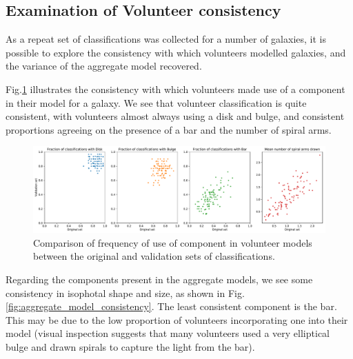 \documentclass[../main.tex]{subfiles}
\begin{document}
\label{sec:results}

\subsection{Examination of Volunteer consistency}
As a repeat set of classifications was collected for a number of galaxies, it is possible to explore the consistency with which volunteers modelled galaxies, and the variance of the aggregate model recovered.

Fig.\ref{fig:volunteer_component_consistency} illustrates the consistency with which volunteers made use of a component in their model for a galaxy. We see that volunteer classification is quite consistent, with volunteers almost always using a disk and bulge, and consistent proportions agreeing on the presence of a bar and the number of spiral arms.

\begin{figure}
  \includegraphics[width=17.3cm]{images__results/component_frequency.pdf}
  \caption{Comparison of frequency of use of component in volunteer models between the original and validation sets of classifications.}
  \label{fig:volunteer_component_consistency}
\end{figure}

Regarding the components present in the aggregate models, we see some consistency in isophotal shape and size, as shown in Fig.\ref{fig:aggregate_model_consistency}. The least consistent component is the bar. This may be due to the low proportion of volunteers incorporating one into their model (visual inspection suggests that many volunteers used a very elliptical bulge and drawn spirals to capture the light from the bar).
\end{document}
